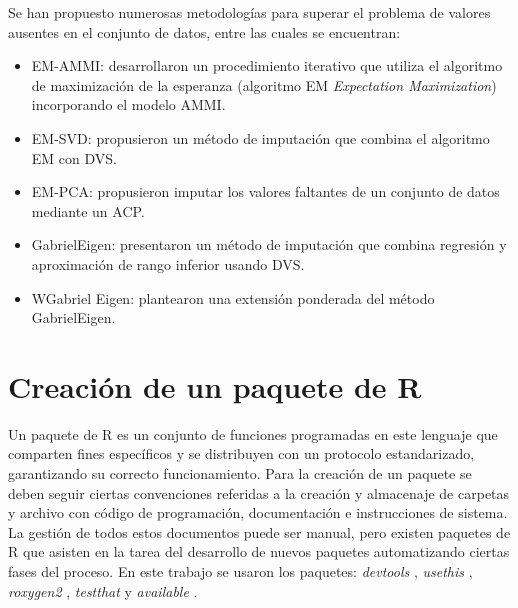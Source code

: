 Se han propuesto numerosas metodologías para superar el problema de valores ausentes en el conjunto de datos, entre las cuales se encuentran:

\begin{itemize}
\item EM-AMMI: \citet{GauchZobel1990} desarrollaron un procedimiento iterativo que utiliza el algoritmo de maximización de la esperanza (algoritmo EM \emph{Expectation Maximization}) incorporando el modelo AMMI. 
\end{itemize}
\begin{itemize}
\item EM-SVD: \citep{Perry2015} propusieron un método de imputación que combina el algoritmo EM con DVS. 
\end{itemize}
\begin{itemize}
\item EM-PCA: \citet{JosseHusson2016} propusieron imputar los valores faltantes de un conjunto de datos mediante un ACP.
\end{itemize}
\begin{itemize}
\item GabrielEigen: \citet{Alarconetal2010} presentaron un método de imputación que combina regresión y aproximación de rango inferior usando DVS. 
\end{itemize}
\begin{itemize}
\item WGabriel Eigen: \citet{Alarconetal2014} plantearon una extensión ponderada del método GabrielEigen.
\end{itemize}


\section{Creación de un paquete de R}


Un paquete de R es un conjunto de funciones programadas en este lenguaje que comparten fines específicos y se distribuyen con un protocolo estandarizado, garantizando su correcto funcionamiento. Para la creación de un paquete se deben seguir ciertas convenciones referidas a la creación y almacenaje de carpetas y archivo con código de programación, documentación e instrucciones de sistema. La gestión de todos estos documentos puede ser manual, pero existen paquetes de R que asisten en la tarea del desarrollo de nuevos paquetes automatizando ciertas fases del proceso. En este trabajo se usaron los paquetes: \emph{devtools} \citep{Wickhametal2021}, \emph{usethis} \citep{WickhamBryan2021}, \emph{roxygen2} \citep{Wickhametal2020}, \emph{testthat} \citep{Wickham2011} y \emph{available} \citep{Ganzetal2019}. 

